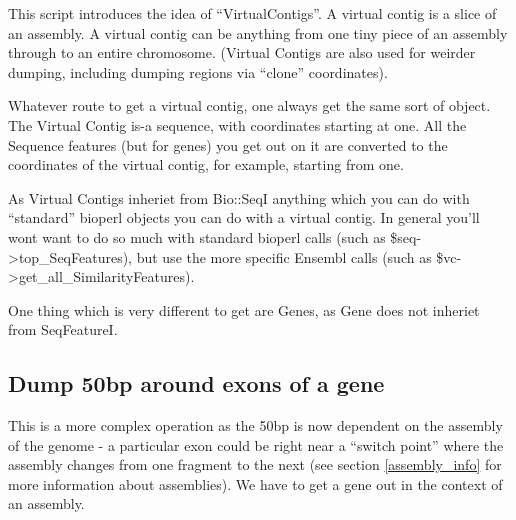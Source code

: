 \documentclass[11pt,a4paper]{article}
\begin{document}
This script introduces the idea of ``VirtualContigs''. A virtual contig is a
slice of an assembly. A virtual contig can be anything from one tiny piece
of an assembly through to an entire chromosome. (Virtual Contigs are also used
for weirder dumping, including dumping regions via ``clone'' coordinates).

Whatever route to get a virtual contig, one always get the same sort
of object.  The Virtual Contig is-a sequence, with coordinates
starting at one. All the Sequence features (but for genes) you get out
on it are converted to the coordinates of the virtual contig, for example,
starting from one. 

As Virtual Contigs inheriet from Bio::SeqI anything which you can do
with ``standard'' bioperl objects you can do with a virtual contig. In
general you'll wont want to do so much with standard bioperl calls
(such as \$seq->top\_SeqFeatures), but use the more specific Ensembl
calls (such as \$vc->get\_all\_SimilarityFeatures).

One thing which is very different to get are Genes, as Gene does
not inheriet from SeqFeatureI.


\subsection{Dump 50bp around exons of a gene}

This is a more complex operation as the 50bp is now dependent on the
assembly of the genome - a particular exon could be right near a
``switch point'' where the assembly changes from one fragment to the
next (see section \ref{assembly_info} for more information about
assemblies). We have to get a gene out in the context of an assembly.
\end{document}

